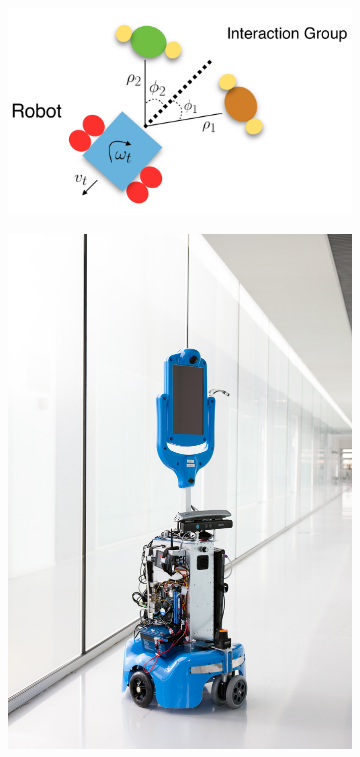 \documentclass[letterpaper, 10 pt, conference]{ieeeconf}
\begin{document}
  	\begin{figure}[tbh]
	\centering
      \begin{subfigure}[b]{0.35\columnwidth}
    \includegraphics[scale = 0.19]{images/data.png}
    \caption{}
    \label{fig:data}
  \end{subfigure}
  \hspace{10mm}
  \begin{subfigure}[b]{0.35\columnwidth}
  \hspace{4mm}
    \includegraphics[scale = 0.13]{images/robot.jpg}


\end{subfigure}
\end{figure}
\end{document}
